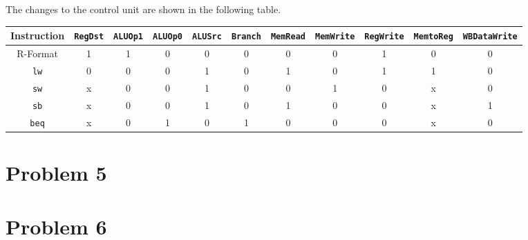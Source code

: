 \documentclass[12pt]{article}
\begin{document}
The changes to the control unit are shown in the following table.
\begin{center}
       {\scriptsize
        \hspace*{-4cm}
        \begin{tabular}{c|c|c|c|c|c|c|c|c|c|c}
                Instruction & \texttt{RegDst} & \texttt{ALUOp1} & \texttt{ALUOp0} & \texttt{ALUSrc} & \texttt{Branch} & \texttt{MemRead}
                & \texttt{MemWrite} & \texttt{RegWrite} & \texttt{MemtoReg} & \texttt{WBDataWrite}\\
                \hline
                R-Format & 1 & 1 & 0 & 0 & 0 & 0 & 0 & 1 & 0 & 0\\
                \texttt{lw} & 0 & 0 & 0 & 1 & 0 & 1 & 0 & 1 & 1 & 0\\
                \texttt{sw} & x & 0 & 0 & 1 & 0 & 0 & 1 & 0 & x & 0\\
                \texttt{sb} & x & 0 & 0 & 1 & 0 & 1 & 0 & 0 & x & 1\\
                \texttt{beq} & x & 0 & 1 & 0 & 1 & 0 & 0 & 0 & x & 0
        \end{tabular}
        \hspace{-4cm}
        }
\end{center}

\section*{Problem 5}

\section*{Problem 6}
\end{document}

